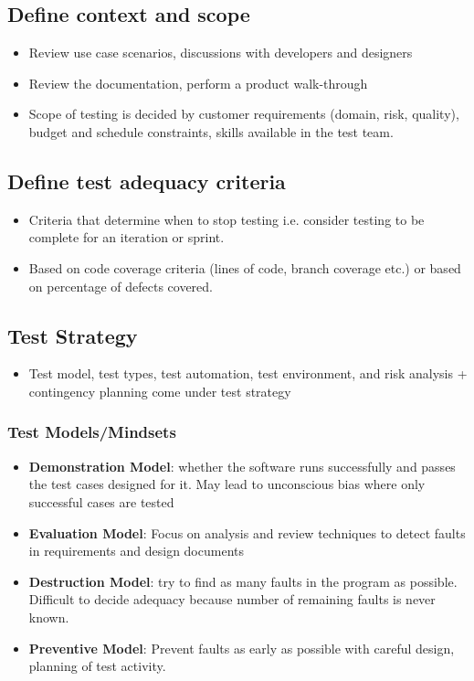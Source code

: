 \documentclass{article}
\begin{document}
\subsection{Define context and scope}
\begin{itemize}
    \item Review use case scenarios, discussions with developers and designers
    
    \item Review the documentation, perform a product walk-through
    
    \item Scope of testing is decided by customer requirements (domain, risk, quality), budget and schedule constraints, skills available in the test team.
\end{itemize}

\subsection{Define test adequacy criteria}
\begin{itemize}
    \item Criteria that determine when to stop testing i.e. consider testing to be complete for an iteration or sprint. 
    
    \item Based on code coverage criteria (lines of code, branch coverage etc.) or based on percentage of defects covered. 
\end{itemize}

\subsection{Test Strategy}
\begin{itemize}
    \item Test model, test types, test automation, test environment, and risk analysis + contingency planning come under test strategy
\end{itemize}

\subsubsection{Test Models/Mindsets}
\begin{itemize}
    \item \textbf{Demonstration Model}: whether the software runs successfully and passes the test cases designed for it. May lead to unconscious bias where only successful cases are tested  
    
    \item \textbf{Evaluation Model}: Focus on analysis and review techniques to detect faults in requirements and design documents
    
    \item \textbf{Destruction Model}: try to find as many faults in the program as possible. Difficult to decide adequacy because number of remaining faults is never known.
    
    \item \textbf{Preventive Model}: Prevent faults as early as possible with careful design, planning of test activity. 
\end{itemize}
\end{document}
